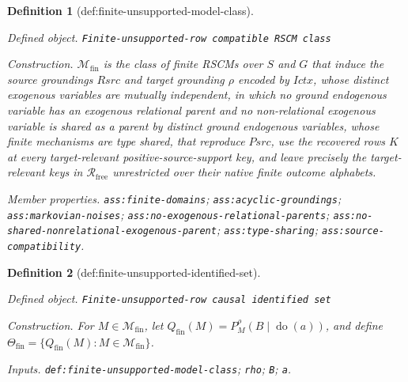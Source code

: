 \documentclass{article}
\newtheorem{definition}{Definition}
\begin{document}
\begin{definition}[def:finite-unsupported-model-class]\label{def:finite-unsupported-model-class}
\par\smallskip\noindent\emph{Defined object.} \texttt{Finite-\allowbreak{}unsupported-\allowbreak{}row compatible RSCM class}
\par\smallskip\noindent\emph{Construction.} \(\mathcal M_{\mathrm{fin}}\) is the class of finite RSCMs over \(S\) and \(G\) that induce the source groundings \(Rsrc\) and target grounding \(\rho\) encoded by \(Ictx\), whose distinct exogenous variables are mutually independent, in which no ground endogenous variable has an exogenous relational parent and no non-relational exogenous variable is shared as a parent by distinct ground endogenous variables, whose finite mechanisms are type shared, that reproduce \(Psrc\), use the recovered rows \(K\) at every target-relevant positive-source-support key, and leave precisely the target-relevant keys in \(\mathcal R_{\mathrm{free}}\) unrestricted over their native finite outcome alphabets.
\par\smallskip\noindent\emph{Member properties.} \texttt{ass:\allowbreak{}finite-\allowbreak{}domains}; \texttt{ass:\allowbreak{}acyclic-\allowbreak{}groundings}; \texttt{ass:\allowbreak{}markovian-\allowbreak{}noises}; \texttt{ass:\allowbreak{}no-\allowbreak{}exogenous-\allowbreak{}relational-\allowbreak{}parents}; \texttt{ass:\allowbreak{}no-\allowbreak{}shared-\allowbreak{}nonrelational-\allowbreak{}exogenous-\allowbreak{}parent}; \texttt{ass:\allowbreak{}type-\allowbreak{}sharing}; \texttt{ass:\allowbreak{}source-\allowbreak{}compatibility}.
\end{definition}

\begin{definition}[def:finite-unsupported-identified-set]\label{def:finite-unsupported-identified-set}
\par\smallskip\noindent\emph{Defined object.} \texttt{Finite-\allowbreak{}unsupported-\allowbreak{}row causal identified set}
\par\smallskip\noindent\emph{Construction.} For \(M\in\mathcal M_{\mathrm{fin}}\), let \(Q_{\mathrm{fin}}(M)=P_M^{\rho}(B\mid\operatorname{do}(a))\), and define \(\Theta_{\mathrm{fin}}=\{Q_{\mathrm{fin}}(M):M\in\mathcal M_{\mathrm{fin}}\}\).
\par\smallskip\noindent\emph{Inputs.} \texttt{def:\allowbreak{}finite-\allowbreak{}unsupported-\allowbreak{}model-\allowbreak{}class}; \texttt{rho}; \texttt{B}; \texttt{a}.
\end{definition}
\end{document}
